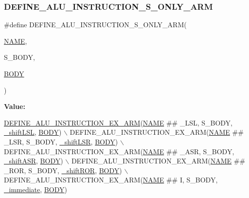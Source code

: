 \subsubsection{\texorpdfstring{D\+E\+F\+I\+N\+E\+\_\+\+A\+L\+U\+\_\+\+I\+N\+S\+T\+R\+U\+C\+T\+I\+O\+N\+\_\+\+S\+\_\+\+O\+N\+L\+Y\+\_\+\+A\+RM}{DEFINE\_ALU\_INSTRUCTION\_S\_ONLY\_ARM}}
{\footnotesize\ttfamily \#define D\+E\+F\+I\+N\+E\+\_\+\+A\+L\+U\+\_\+\+I\+N\+S\+T\+R\+U\+C\+T\+I\+O\+N\+\_\+\+S\+\_\+\+O\+N\+L\+Y\+\_\+\+A\+RM(\begin{DoxyParamCaption}\item[{}]{\mbox{\hyperlink{inflate_8h_a164ea0159d5f0b5f12a646f25f99eceaa67bc2ced260a8e43805d2480a785d312}{N\+A\+ME}},  }\item[{}]{S\+\_\+\+B\+O\+DY,  }\item[{}]{\mbox{\hyperlink{gzlog_8c_aa6bdf6a6d9916c343e1e17774d84a156}{B\+O\+DY}} }\end{DoxyParamCaption})}

{\bfseries Value\+:}
\begin{DoxyCode}
\mbox{\hyperlink{isa-arm_8c_af5a7c9d844c906c7f00a6aa651397587}{DEFINE\_ALU\_INSTRUCTION\_EX\_ARM}}(\mbox{\hyperlink{inflate_8h_a164ea0159d5f0b5f12a646f25f99eceaa67bc2ced260a8e43805d2480a785d312}{NAME}} ## \_LSL, S\_BODY, 
      \mbox{\hyperlink{isa-arm_8c_a8d2da5536596dafb6d1b701db5ac6eca}{\_shiftLSL}}, \mbox{\hyperlink{gzlog_8c_aa6bdf6a6d9916c343e1e17774d84a156}{BODY}}) \(\backslash\)
    DEFINE\_ALU\_INSTRUCTION\_EX\_ARM(\mbox{\hyperlink{inflate_8h_a164ea0159d5f0b5f12a646f25f99eceaa67bc2ced260a8e43805d2480a785d312}{NAME}} ## \_LSR, S\_BODY, \mbox{\hyperlink{isa-arm_8c_a7477c32e969303bc1b4ae8a83c64d3ac}{\_shiftLSR}}, 
      \mbox{\hyperlink{gzlog_8c_aa6bdf6a6d9916c343e1e17774d84a156}{BODY}}) \(\backslash\)
    DEFINE\_ALU\_INSTRUCTION\_EX\_ARM(\mbox{\hyperlink{inflate_8h_a164ea0159d5f0b5f12a646f25f99eceaa67bc2ced260a8e43805d2480a785d312}{NAME}} ## \_ASR, S\_BODY, \mbox{\hyperlink{isa-arm_8c_aedec32cf3d293a334f38a37b00eaeb06}{\_shiftASR}}, 
      \mbox{\hyperlink{gzlog_8c_aa6bdf6a6d9916c343e1e17774d84a156}{BODY}}) \(\backslash\)
    DEFINE\_ALU\_INSTRUCTION\_EX\_ARM(\mbox{\hyperlink{inflate_8h_a164ea0159d5f0b5f12a646f25f99eceaa67bc2ced260a8e43805d2480a785d312}{NAME}} ## \_ROR, S\_BODY, \mbox{\hyperlink{isa-arm_8c_a7ac9fa3bbd1d0f6e309b9ece3a7f5bd3}{\_shiftROR}}, 
      \mbox{\hyperlink{gzlog_8c_aa6bdf6a6d9916c343e1e17774d84a156}{BODY}}) \(\backslash\)
    DEFINE\_ALU\_INSTRUCTION\_EX\_ARM(\mbox{\hyperlink{inflate_8h_a164ea0159d5f0b5f12a646f25f99eceaa67bc2ced260a8e43805d2480a785d312}{NAME}} ## I, S\_BODY, \mbox{\hyperlink{isa-arm_8c_a5948ab4e0f82eb11d17504a8cc5237b7}{\_immediate}}, 
      \mbox{\hyperlink{gzlog_8c_aa6bdf6a6d9916c343e1e17774d84a156}{BODY}})
\end{DoxyCode}
\mbox{\label{isa-arm_8c_a56ae89d1d9edfe3d78f30c0a60273883}} 

